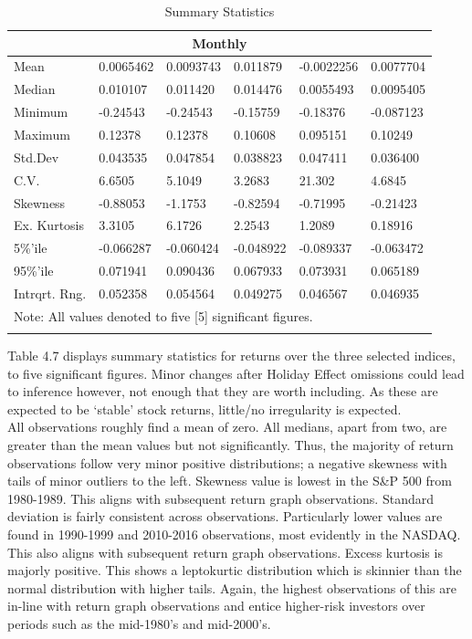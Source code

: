 \documentclass[11pt, english]{article}
\begin{document}
\begin{center}
\begin{longtable}{p{2cm}p{2cm}p{2cm}p{2cm}p{2cm}p{2cm} }
                \multicolumn{6}{c}{\textbf{Monthly}}\\ 
                \hline 
                Mean & 0.0065462 & 0.0093743 & 0.011879 & -0.0022256 & 0.0077704\\
                Median & 0.010107 & 0.011420 & 0.014476 & 0.0055493 & 0.0095405\\
                Minimum & -0.24543 & -0.24543 & -0.15759 & -0.18376 & -0.087123\\
                Maximum & 0.12378 & 0.12378 & 0.10608 & 0.095151 & 0.10249\\
                Std.Dev & 0.043535 & 0.047854 & 0.038823 & 0.047411 & 0.036400\\
                C.V. & 6.6505 & 5.1049 & 3.2683 & 21.302 & 4.6845\\
                Skewness & -0.88053 & -1.1753 & -0.82594 & -0.71995 & -0.21423\\
                Ex. Kurtosis & 3.3105 & 6.1726 & 2.2543 & 1.2089 & 0.18916\\
                5\%’ile & -0.066287 & -0.060424 & -0.048922 & -0.089337 & -0.063472\\
                95\%’ile & 0.071941 & 0.090436 & 0.067933 & 0.073931 & 0.065189\\
                Intrqrt. Rng. & 0.052358 & 0.054564 & 0.049275 & 0.046567 & 0.046935\\
		\hline
		\multicolumn{6}{l}{Note: All values denoted to five [5] significant figures.}\\
		\hline
		\caption{Summary Statistics}
	\end{longtable}
	\end{center}

	Table 4.7 displays summary statistics for returns over the three selected indices, to five significant figures. Minor changes after Holiday Effect omissions could lead to inference however, not enough that they are worth including. As these are expected to be `stable’ stock returns, little/no irregularity is expected.\\

	All observations roughly find a mean of zero. All medians, apart from two, are greater than the mean values but not significantly. Thus, the majority of return observations follow very minor positive distributions; a negative skewness with tails of minor outliers to the left. Skewness value is lowest in the S\&P 500 from 1980-1989. This aligns with subsequent return graph observations. Standard deviation is fairly consistent across observations. Particularly lower values are found in 1990-1999 and 2010-2016 observations, most evidently in the NASDAQ. This also aligns with subsequent return graph observations. Excess kurtosis is majorly positive. This shows a leptokurtic distribution which is skinnier than the normal distribution with higher tails. Again, the highest observations of this are in-line with return graph observations and entice higher-risk investors over periods such as the mid-1980’s and mid-2000’s.
\end{document}
